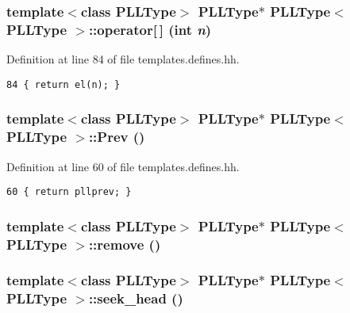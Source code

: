 \subsubsection{\setlength{\rightskip}{0pt plus 5cm}template$<$class PLLType$>$ PLLType$\ast$ PLLType$<$ PLLType $>$::operator[$\,$] (int {\em n})\hspace{0.3cm}{\tt  [inline]}}\label{classPLLType_a16}




Definition at line 84 of file templates.defines.hh.



\footnotesize\begin{verbatim}84 { return el(n); } 
\end{verbatim}\normalsize 
{}
\subsubsection{\setlength{\rightskip}{0pt plus 5cm}template$<$class PLLType$>$ PLLType$\ast$ PLLType$<$ PLLType $>$::Prev ()\hspace{0.3cm}{\tt  [inline]}}\label{classPLLType_a2}




Definition at line 60 of file templates.defines.hh.



\footnotesize\begin{verbatim}60 { return pllprev; } 
\end{verbatim}\normalsize 
{}
\subsubsection{\setlength{\rightskip}{0pt plus 5cm}template$<$class PLLType$>$ PLLType$\ast$ PLLType$<$ PLLType $>$::remove ()\hspace{0.3cm}{\tt  [inline]}}\label{classPLLType_a12}


\subsubsection{\setlength{\rightskip}{0pt plus 5cm}template$<$class PLLType$>$ PLLType$\ast$ PLLType$<$ PLLType $>$::seek\_\-head ()\hspace{0.3cm}{\tt  [inline]}}\label{classPLLType_a6}


